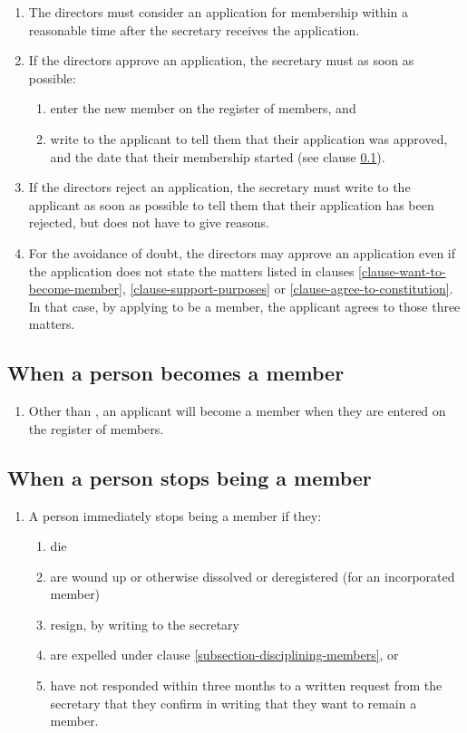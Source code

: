 \documentclass[a4paper]{article}
\let\emph\relax
\begin{document}
\begin{enumerate}
\item The directors must consider an application for membership within a reasonable time after the secretary receives the application.
\item If the directors approve an application, the secretary must as soon as possible:
    \begin{enumerate}
    \item enter the new member on the register of members, and
    \item write to the applicant to tell them that their application was approved, and the date that their membership started (see clause \ref{subsection-when-a-person-becomes-a-member}).
    \end{enumerate}
\item If the directors reject an application, the secretary must write to the applicant as soon as possible to tell them that their application has been rejected, but does not have to give reasons.
\item For the avoidance of doubt, the directors may approve an application even if the application does not state the matters listed in clauses \ref{clause-want-to-become-member}, \ref{clause-support-purposes} or \ref{clause-agree-to-constitution}. In that case, by applying to be a member, the applicant agrees to those three matters.
\end{enumerate}

\subsection{When a person becomes a member}
\label{subsection-when-a-person-becomes-a-member}

\begin{enumerate}
\item Other than \emph{initial members}, an applicant will become a member when they are entered on the register of members.
\end{enumerate}

\subsection{When a person stops being a member}

\begin{enumerate}
\item A person immediately stops being a member if they:
    \begin{enumerate}
    \item die
    \item are wound up or otherwise dissolved or deregistered (for an incorporated member)
    \item resign, by writing to the secretary
    \item are expelled under clause \ref{subsection-disciplining-members}, or
    \item have not responded within three months to a written request from the secretary that they confirm in writing that they want to remain a member.
    \end{enumerate}
\end{enumerate}
\end{document}
